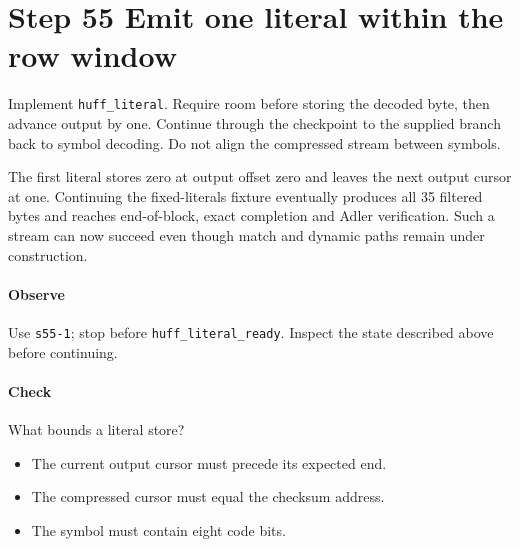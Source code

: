 \section{Step 55 Emit one literal within the row window}\label{png-huff-s55}
Implement \texttt{huff\_literal}. Require room before storing the decoded byte, then advance output by one. Continue through the checkpoint to the supplied branch back to symbol decoding. Do not align the compressed stream between symbols.

The first literal stores zero at output offset zero and leaves the next output cursor at one. Continuing the fixed-literals fixture eventually produces all 35 filtered bytes and reaches end-of-block, exact completion and Adler verification. Such a stream can now succeed even though match and dynamic paths remain under construction.

\paragraph{Observe} Use \texttt{s55-1}; stop before \texttt{huff\_literal\_ready}. Inspect the state described above before continuing.

\paragraph{Check} What bounds a literal store?
\begin{itemize}
\item[A.] The current output cursor must precede its expected end.
\item[B.] The compressed cursor must equal the checksum address.
\item[C.] The symbol must contain eight code bits.
\end{itemize}
